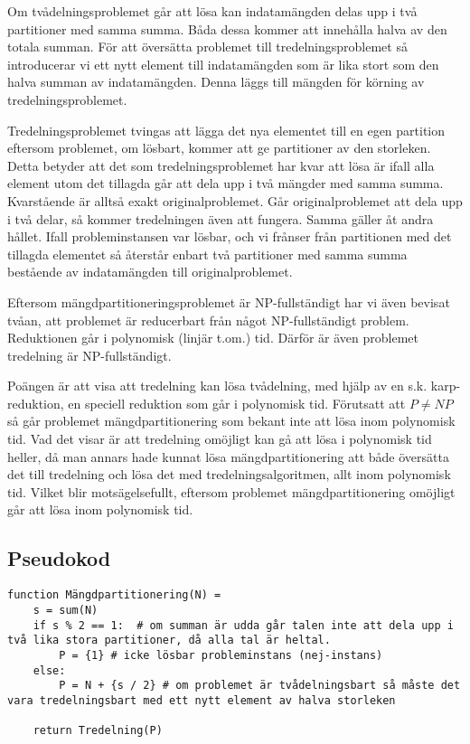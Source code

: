 \documentclass[a4paper,10pt,twoside]{article}
\begin{document}
Om tvådelningsproblemet går att lösa kan indatamängden delas upp i två partitioner med samma summa. Båda dessa kommer att innehålla halva av den totala summan. För att översätta problemet till tredelningsproblemet så introducerar vi ett nytt element till indatamängden som är lika stort som den halva summan av indatamängden. Denna läggs till mängden för körning av tredelningsproblemet.

Tredelningsproblemet tvingas att lägga det nya elementet till en egen partition eftersom problemet, om lösbart, kommer att ge partitioner av den storleken. Detta betyder att det som tredelningsproblemet har kvar att lösa är ifall alla element utom det tillagda går att dela upp i två mängder med samma summa. Kvarstående är alltså exakt originalproblemet. Går originalproblemet att dela upp i två delar, så kommer tredelningen även att fungera. Samma gäller åt andra hållet. Ifall probleminstansen var lösbar, och vi frånser från partitionen med det tillagda elementet så återstår enbart två partitioner med samma summa bestående av indatamängden till originalproblemet.

Eftersom mängdpartitioneringsproblemet är NP-fullständigt har vi även bevisat tvåan, att problemet är reducerbart från något NP-fullständigt problem. Reduktionen går i polynomisk (linjär t.om.) tid. Därför är även problemet tredelning är NP-fullständigt.

Poängen är att visa att tredelning kan lösa tvådelning, med hjälp av en s.k. karp-reduktion, en speciell reduktion som går i polynomisk tid. Förutsatt att $P \neq NP$ så går problemet mängdpartitionering som bekant inte att lösa inom polynomisk tid. Vad det visar är att tredelning omöjligt kan gå att lösa i polynomisk tid heller, då man annars hade kunnat lösa mängdpartitionering att både översätta det till tredelning och lösa det med tredelningsalgoritmen, allt inom polynomisk tid. Vilket blir motsägelsefullt, eftersom problemet mängdpartitionering omöjligt går att lösa inom polynomisk tid.


\subsection{Pseudokod}

\begin{lstlisting}
function Mängdpartitionering(N) =
	s = sum(N)
	if s % 2 == 1:	# om summan är udda går talen inte att dela upp i två lika stora partitioner, då alla tal är heltal.
		P = {1}	# icke lösbar probleminstans (nej-instans)
	else:
		P = N + {s / 2}	# om problemet är tvådelningsbart så måste det vara tredelningsbart med ett nytt element av halva storleken

	return Tredelning(P)

\end{lstlisting}
\end{document}
